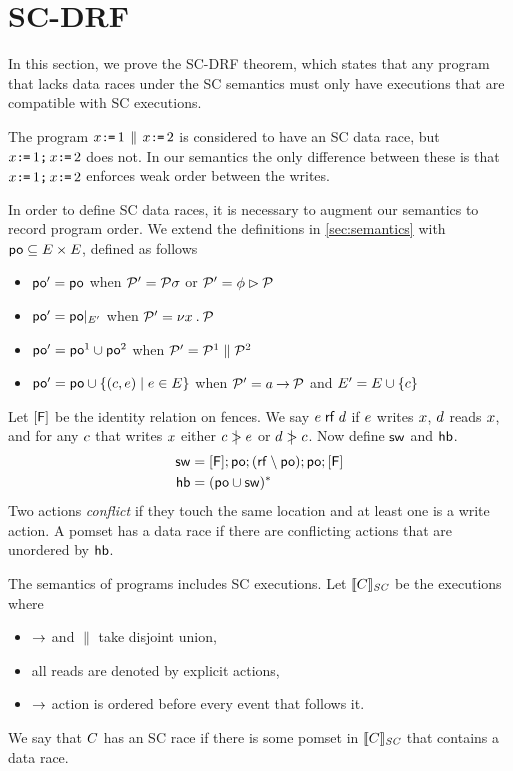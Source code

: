 \section{SC-DRF}


In this section, we prove the SC-DRF theorem, which states that any program
that lacks data races under the SC semantics must only have executions that
are compatible with SC executions.

The program $x\texttt{:}\mkern-1mu\texttt{=}\,1\,\mathbin{\|}\,x\texttt{:}\mkern-1mu\texttt{=}\,2$ is considered to have an SC data
race, but $x\texttt{:}\mkern-1mu\texttt{=}\,1\texttt{;}\,x\texttt{:}\mkern-1mu\texttt{=}\,2$ does not.  In our semantics the only
difference between these is that $x\texttt{:}\mkern-1mu\texttt{=}\,1\texttt{;}\,x\texttt{:}\mkern-1mu\texttt{=}\,2$ enforces weak
order between the writes.

In order to define SC data races, it is necessary to augment our semantics to
record program order.  We extend the definitions in
\textsection\ref{sec:semantics} with
${\mathrel{\mathsf{po}}}\subseteq{E}\times{E}$, defined as follows
\begin{itemize}
\item
  ${\mathrel{\mathsf{po}}'} = {\mathrel{\mathsf{po}}}$
  when $\mathcal{P}'=\mathcal{P}\sigma$
  or $\mathcal{P}'=\phi\mathbin\rhd\mathcal{P}$
\item
  ${\mathrel{\mathsf{po}}'} = {\mathrel{\mathsf{po}}}\mathbin{|}_{E'}$
  when $\mathcal{P}'=\nu x\mathbin.\mathcal{P}$
\item
  ${\mathrel{\mathsf{po}}'} = {\mathrel{\mathsf{po}}}^1\cup{\ensuremath{\mathrel{\mathsf{po}}}}^2$
  when $\mathcal{P}'=\mathcal{P}^1\parallel\mathcal{P}^2$
\item
  ${\mathrel{\mathsf{po}}'} = {\mathrel{\mathsf{po}}}\cup\{(c,e)\mid e\in E\}$
  when $\mathcal{P}'=a\mathbin\rightarrow\mathcal{P}$ and $E' = E \cup \{c\}$
\end{itemize}
Let $[\mathsf{F}]$ be the identity relation on fences.
We say $e\mathrel{\mathsf{rf}}d$ if $e$ writes $x$, $d$ reads $x$, and for any $c$ that writes $x$ either $c\mathrel{\mkern4mu\mid\!\!\!>}e$ or $d\mathrel{\mkern4mu\mid\!\!\!>}c$.
Now define $\mathrel{\mathsf{sw}}$ and $\mathrel{\mathsf{hb}}$.
\begin{align*}
  {\ensuremath{\mathrel{\mathsf{sw}}}} &= [\mathsf{F}]; {\mathrel{\mathsf{po}}}; ({\mathrel{\mathsf{rf}}}\setminus{\ensuremath{\mathrel{\mathsf{po}}}}); {\mathrel{\mathsf{po}}}; [\mathsf{F}]
  \\
  {\mathrel{\mathsf{hb}}} &= ({\mathrel{\mathsf{po}}} \cup {\ensuremath{\mathrel{\mathsf{sw}}}})^*
\end{align*}
Two actions \emph{conflict} if they touch the same location and at least one
is a write action.  A pomset has a data race if there are conflicting actions
that are unordered by $\mathrel{\mathsf{hb}}$.

The semantics of programs includes SC executions.  Let $\llbracket C\rrbracket_{\textit{SC}}$ be the
executions where
\begin{itemize}
\item $\mathbin\rightarrow$ and $\parallel$ take disjoint union,
\item all reads are denoted by explicit actions,
\item $\mathbin\rightarrow$ action is ordered before every event that follows it.
\end{itemize}
We say that $C$ has an SC race if there is some pomset in $\llbracket C\rrbracket_{\textit{SC}}$
that contains a data race.

